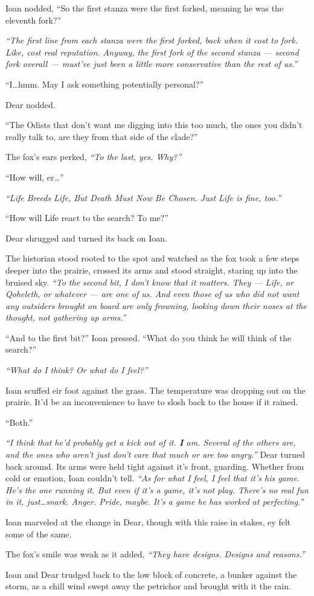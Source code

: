 Ioan nodded, ``So the first stanza were the first forked, meaning he was the eleventh fork?''

\emph{``The first line from each stanza were the first forked, back when it cost to fork. Like, cost real reputation. Anyway, the first fork of the second stanza — second fork overall — must've just been a little more conservative than the rest of us.''}

``I\ldots{}hmm. May I ask something potentially personal?''

Dear nodded.

``The Odists that don't want me digging into this too much, the ones you didn't really talk to, are they from that side of the clade?''

The fox's ears perked, \emph{``To the last, yes. Why?''}

``How will, er\ldots{}''

\emph{``Life Breeds Life, But Death Must Now Be Chosen. Just Life is fine, too.''}

``How will Life react to the search? To me?''

Dear shrugged and turned its back on Ioan.

The historian stood rooted to the spot and watched as the fox took a few steps deeper into the prairie, crossed its arms and stood straight, staring up into the bruised sky. \emph{``To the second bit, I don't know that it matters. They — Life, or Qoheleth, or whatever — are one of us. And even those of us who did not want any outsiders brought on board are only frowning, looking down their noses at the thought, not gathering up arms.''}

``And to the first bit?'' Ioan pressed. ``What do you think he will think of the search?''

\emph{``What do I think? Or what do I feel?''}

Ioan scuffed eir foot against the grass. The temperature was dropping out on the prairie. It'd be an inconvenience to have to slosh back to the house if it rained.

``Both.''

\emph{``I think that he'd probably get a kick out of it. \textbf{I} am. Several of the others are, and the ones who aren't just don't care that much or are too angry.''} Dear turned back around. Its arms were held tight against it's front, guarding. Whether from cold or emotion, Ioan couldn't tell. \emph{``As for what I feel, I feel that it's his game. He's the one running it. But even if it's a game, it's not play. There's no real fun in it, just\ldots{}snark. Anger. Pride, maybe. It's a game he has worked at perfecting.''}

Ioan marveled at the change in Dear, though with this raise in stakes, ey felt some of the same.

The fox's smile was weak as it added, \emph{``They have designs. Designs and reasons.''}

Ioan and Dear trudged back to the low block of concrete, a bunker against the storm, as a chill wind swept away the petrichor and brought with it the rain.
